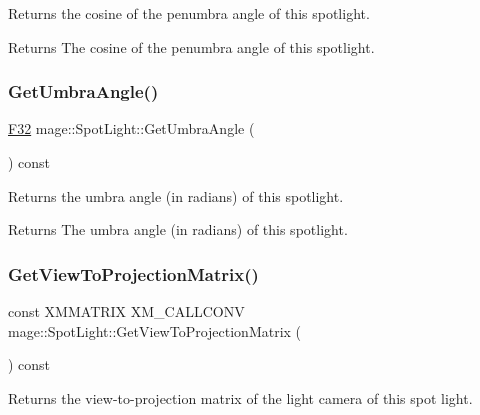 Returns the cosine of the penumbra angle of this spotlight.

\begin{DoxyReturn}{Returns}
The cosine of the penumbra angle of this spotlight. 
\end{DoxyReturn}
\hypertarget{classmage_1_1_spot_light_ae29059615f77f1afe414dc826b2d2af8}{}\label{classmage_1_1_spot_light_ae29059615f77f1afe414dc826b2d2af8} 
\subsubsection{\texorpdfstring{Get\+Umbra\+Angle()}{GetUmbraAngle()}}
{\footnotesize\ttfamily \hyperlink{namespacemage_aa97e833b45f06d60a0a9c4fc22ae02c0}{F32} mage\+::\+Spot\+Light\+::\+Get\+Umbra\+Angle (\begin{DoxyParamCaption}{ }\end{DoxyParamCaption}) const\hspace{0.3cm}{\ttfamily [noexcept]}}

Returns the umbra angle (in radians) of this spotlight.

\begin{DoxyReturn}{Returns}
The umbra angle (in radians) of this spotlight. 
\end{DoxyReturn}
\hypertarget{classmage_1_1_spot_light_ae436e8fee37639e9218cc7f3822cebbd}{}\label{classmage_1_1_spot_light_ae436e8fee37639e9218cc7f3822cebbd} 
\subsubsection{\texorpdfstring{Get\+View\+To\+Projection\+Matrix()}{GetViewToProjectionMatrix()}}
{\footnotesize\ttfamily const X\+M\+M\+A\+T\+R\+IX X\+M\+\_\+\+C\+A\+L\+L\+C\+O\+NV mage\+::\+Spot\+Light\+::\+Get\+View\+To\+Projection\+Matrix (\begin{DoxyParamCaption}{ }\end{DoxyParamCaption}) const\hspace{0.3cm}{\ttfamily [noexcept]}}

Returns the view-\/to-\/projection matrix of the light camera of this spot light.

